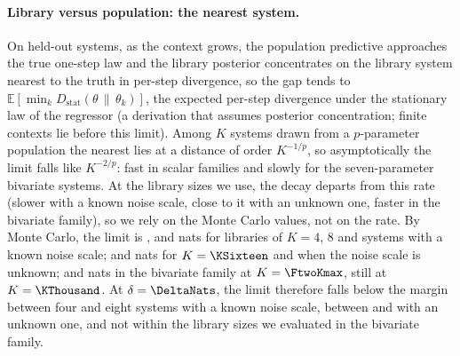 \paragraph{Library versus population: the nearest system.} On held-out systems, as the context grows, the population
predictive approaches the true one-step law and the library posterior concentrates on the library system nearest to the
truth in per-step divergence, so the gap tends to $\mathbb E[\min_k D_{\mathrm{stat}}(\theta\,\|\,\theta_k)]$, the expected
per-step divergence under the stationary law of the regressor (a derivation that assumes posterior concentration; finite
contexts lie before this limit). Among $K$ systems drawn from a $p$-parameter population the nearest lies at a distance of
order $K^{-1/p}$, so asymptotically the limit falls like $K^{-2/p}$: fast in scalar families and slowly for the
seven-parameter bivariate systems. At the library sizes we use, the decay departs from this rate (slower with a known noise
scale, close to it with an unknown one, faster in the bivariate family), so we rely on the Monte Carlo values, not on the
rate. By Monte Carlo, the limit is \NaKnownFour, \NaKnownEight and \NaKnownSixteen nats for libraries of
$K=4$, $8$ and \KSixteen systems with a known noise scale; \NaUnknownSixteen and \NaUnknownThirtyTwo nats for $K=\KSixteen$
and \KThirtyTwo when the noise scale is unknown; and \NaTwoSixtyFour nats in the bivariate family at $K=\FtwoKmax$, still
\NaTwoThousand at $K=\KThousand$. At $\delta=\DeltaNats$, the limit therefore falls below the margin between four and eight
systems with a known noise scale, between \KSixteen and \KThirtyTwo with an unknown one, and not within the library sizes we
evaluated in the bivariate family.
